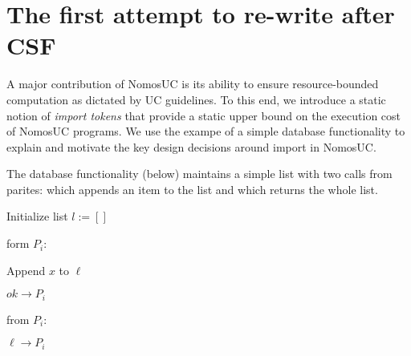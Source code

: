 \section{The first attempt to re-write after CSF}
A major contribution of NomosUC is its ability to ensure resource-bounded computation
as dictated by UC guidelines.
To this end, we introduce a static notion of \emph{import tokens} that provide a static upper
bound on the execution cost of NomosUC programs.
We use the exampe of a simple database functionality to explain and motivate the key design decisions around import in NomosUC.

The database functionality \Fdb (below) maintains a simple list with two calls from parites:  which appends an item to the list and  which returns the whole list. 
\begin{bbox}[title={Functionality $\F_{\msf{db}}$}]

Initialize list $l := []$

\OnInput {} form $P_i$:
    \begin{ritemize}
        \item Append $x$ to $\ell$
        \item \Send $ok \rightarrow P_i$
    \end{ritemize}

\OnInput {}from $P_i$:
    \begin{ritemize}
        \item \Send $\ell \rightarrow P_i$
    \end{ritemize}
\end{bbox}

